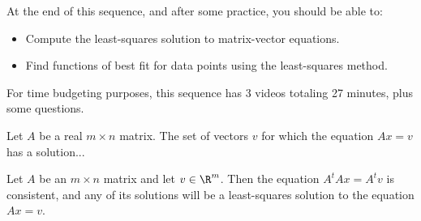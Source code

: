







At the end of this sequence, and after some practice, you should be able to:

\begin{itemize}
\item Compute the least-squares solution to matrix-vector equations.
\item Find functions of best fit for data points using the least-squares method.  
\end{itemize}

For time budgeting purposes, this sequence has 3 videos totaling 27 minutes, 
plus some questions.  



\endedxtext

\endedxvertical






Let $A$ be a  real  $m\times n$ matrix.  The set of vectors $v$ for which the equation $Ax=v$ has a solution...





\endedxproblem



\endedxvertical










{}  
Let $A$ be an $m\times n$ matrix and let $v\in \R^m$.  Then the equation
$A^t Ax = A^t v$ is consistent, and any of its solutions will be a least-squares solution 
to the equation $Ax = v$.  


